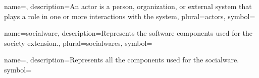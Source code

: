 {name={},
description={An actor is a person, organization, or external system that plays a role in one or more interactions with the system},
plural={actors},
symbol={}
}

{name={socialware},
description={Represents the software 
components used for the society extension.},
plural={socialwares},
symbol={}
}


{name={},
description={Represents all the \glsict components used for the \gls{socialware}.}
symbol={}
}

